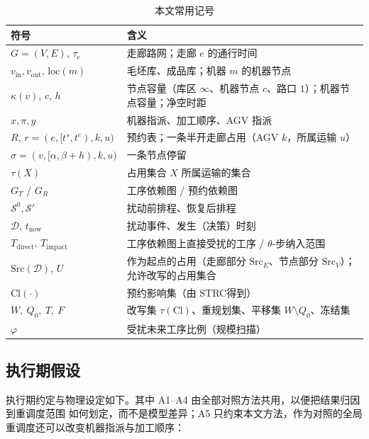 \documentclass[manuscript,screen,review]{acmart}
\providecommand{\STRC}{\textsc{STRC}}
\begin{document}
\begin{table}[t]
\centering
\caption{本文常用记号}
\label{tab:notation}
\small
\begin{tabular}{@{}ll@{}}
\toprule
\textbf{符号} & \textbf{含义} \\
\midrule
\(G=(V,E)\), \(\tau_e\) & 走廊路网；走廊 \(e\) 的通行时间 \\
\(v_{\mathrm{in}},v_{\mathrm{out}}\), \(\mathrm{loc}(m)\) & 毛坯库、成品库；机器 \(m\) 的机器节点 \\
\(\kappa(v)\), \(c\), \(h\) & 节点容量（库区 \(\infty\)、机器节点 \(c\)、路口 \(1\)）；机器节点容量；净空时距 \\
\(x,\pi,y\) & 机器指派、加工顺序、AGV 指派 \\
\(R\), \(r=(e,[t^s,t^e),k,u)\) & 预约表；一条半开走廊占用（AGV \(k\)，所属运输 \(u\)）\\
\(\sigma=(v,[\alpha,\beta+h),k,u)\) & 一条节点停留 \\
\(\tau(X)\) & 占用集合 \(X\) 所属运输的集合 \\
\(G_T\) / \(G_R\) & 工序依赖图 / 预约依赖图 \\
\(\mathcal{S}^0,\mathcal{S}'\) & 扰动前排程、恢复后排程 \\
\(\mathcal{D},\,t_{\mathrm{now}}\) & 扰动事件、发生（决策）时刻 \\
\(T_{\mathrm{direct}},\,T_{\mathrm{impact}}\) & 工序依赖图上直接受扰的工序 / \(\theta\)-步纳入范围 \\
\(\mathrm{Src}(\mathcal{D})\), \(U\) & 作为起点的占用（走廊部分 \(\mathrm{Src}_E\)、节点部分 \(\mathrm{Src}_V\)）；允许改写的占用集合 \\
\(\mathrm{Cl}(\cdot)\) & 预约影响集（由 \STRC 得到）\\
\(W,\ Q_0,\ T,\ F\) & 改写集 \(\tau(\mathrm{Cl})\)、重规划集、平移集 \(W\setminus Q_0\)、冻结集 \\
\(\varphi\) & 受扰未来工序比例（规模扫描）\\
\bottomrule
\end{tabular}
\end{table}

\subsection{执行期假设}
\label{sec:assumptions}

执行期约定与物理设定如下。其中 A1--A4 由全部对照方法共用，以便把结果归因到重调度范围
如何划定，而不是模型差异；A5 只约束本文方法，作为对照的全局重调度还可以改变机器指派与加工顺序：
\end{document}
